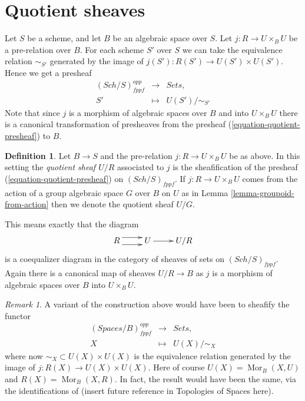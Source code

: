 \documentclass{stacks-project}
\theoremstyle{plain}
\theoremstyle{definition}
\newtheorem{definition}[subsection]{Definition}
\theoremstyle{remark}
\newtheorem{remark}[subsection]{Remark}
\numberwithin{equation}{subsection}
\def\Sch{\mathit{Sch}}
\def\Mor{\mathop{\mathrm{Mor}}\nolimits}
\begin{document}
\section{Quotient sheaves}
\label{section-quotient-sheaves}

\noindent
Let $S$ be a scheme, and let $B$ be an algebraic space over $S$.
Let $j : R \to U \times_B U$ be a pre-relation over $B$.
For each scheme $S'$ over $S$ we can take the equivalence relation
$\sim_{S'}$ generated by the image of $j(S') : R(S') \to U(S') \times U(S')$.
Hence we get a presheaf
\begin{equation}
\label{equation-quotient-presheaf}
\begin{matrix}
(\Sch/S)^{opp}_{fppf} &
\longrightarrow &
\textit{Sets}, \\
S' &
\longmapsto  &
U(S')/\sim_{S'}
\end{matrix}
\end{equation}
Note that since $j$ is a morphism of algebraic spaces over $B$
and into $U \times_B U$ there is a canonical transformation of
presheaves from the presheaf (\ref{equation-quotient-presheaf}) to $B$.

\begin{definition}
\label{definition-quotient-sheaf}
Let $B \to S$ and the pre-relation $j : R \to U \times_B U$ be as above.
In this setting the {\it quotient sheaf $U/R$} associated
to $j$ is the sheafification of the presheaf
(\ref{equation-quotient-presheaf}) on $(\Sch/S)_{fppf}$.
If $j : R \to U \times_B U$ comes from the action of a
group algebraic space $G$ over $B$ on $U$ as in
Lemma \ref{lemma-groupoid-from-action}
then we denote the quotient sheaf $U/G$.
\end{definition}

\noindent
This means exactly that the diagram
$$
\xymatrix{
R \ar@<1ex>[r] \ar@<-1ex>[r] &
U \ar[r] &
U/R
}
$$
is a coequalizer diagram in the category of sheaves of sets
on $(\Sch/S)_{fppf}$. Again there is a canonical map
of sheaves $U/R \to B$ as $j$ is a morphism of algebraic spaces over
$B$ into $U \times_B U$.

\begin{remark}
\label{remark-quotient-variant}
A variant of the construction above would have been to sheafify
the functor
$$
\begin{matrix}
(\textit{Spaces}/B)^{opp}_{fppf} &
\longrightarrow &
\textit{Sets}, \\
X &
\longmapsto  &
U(X)/\sim_X
\end{matrix}
$$
where now $\sim_X \subset U(X) \times U(X)$ is the equivalence relation
generated by the image of $j : R(X) \to U(X) \times U(X)$.
Here of course $U(X) = \Mor_B(X, U)$ and $R(X) = \Mor_B(X, R)$.
In fact, the result would have been the same, via the identifications
of (insert future reference in Topologies of Spaces here).
\end{remark}
\end{document}
